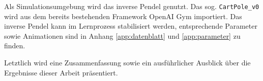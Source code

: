	Als Simulationsumgebung wird das inverse Pendel genutzt. Das sog. \texttt{CartPole\_v0} wird aus dem bereits bestehenden Framework OpenAI Gym \cite{Brockman2016} importiert. Das inverse Pendel kann im Lernprozess stabilisiert werden, entsprechende Parameter sowie Animationen sind in Anhang \ref{app:datenblatt} und \ref{app:parameter} zu finden.
	
	Letztlich wird eine Zusammenfassung sowie ein ausführlicher Ausblick über die Ergebnisse dieser Arbeit präsentiert.

